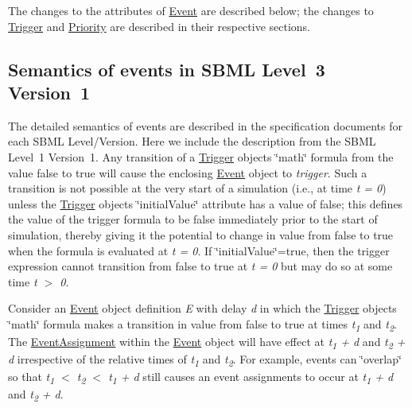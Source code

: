 The changes to the attributes of \hyperlink{class_event}{Event} are described below; the changes to \hyperlink{class_trigger}{Trigger} and \hyperlink{class_priority}{Priority} are described in their respective sections.\hypertarget{class_event_semantics}{}\subsection{Semantics of events in S\+B\+M\+L Level 3 Version 1}\label{class_event_semantics}
The detailed semantics of events are described in the specification documents for each S\+B\+ML Level/\+Version. Here we include the description from the S\+B\+ML Level~1 Version~1. Any transition of a \hyperlink{class_trigger}{Trigger} object\textquotesingle{}s \char`\"{}math\char`\"{} formula from the value {\ttfamily false} to {\ttfamily true} will cause the enclosing \hyperlink{class_event}{Event} object to {\itshape trigger}. Such a transition is not possible at the very start of a simulation (i.\+e., at time {\itshape t = 0}) unless the \hyperlink{class_trigger}{Trigger} object\textquotesingle{}s \char`\"{}initial\+Value\char`\"{} attribute has a value of {\ttfamily false}; this defines the value of the trigger formula to be {\ttfamily false} immediately prior to the start of simulation, thereby giving it the potential to change in value from {\ttfamily false} to {\ttfamily true} when the formula is evaluated at {\itshape t = 0}. If \char`\"{}initial\+Value\char`\"{}={\ttfamily true}, then the trigger expression cannot transition from {\ttfamily false} to {\ttfamily true} at {\itshape t = 0} but may do so at some time {\itshape t $>$ 0}.

Consider an \hyperlink{class_event}{Event} object definition {\itshape E} with delay {\itshape d} in which the \hyperlink{class_trigger}{Trigger} object\textquotesingle{}s \char`\"{}math\char`\"{} formula makes a transition in value from {\ttfamily false} to {\ttfamily true} at times {\itshape t\textsubscript{1}} and {\itshape t\textsubscript{2}}. The \hyperlink{class_event_assignment}{Event\+Assignment} within the \hyperlink{class_event}{Event} object will have effect at {\itshape t\textsubscript{1} + d} and {\itshape t\textsubscript{2} + d} irrespective of the relative times of {\itshape t\textsubscript{1}} and {\itshape t\textsubscript{2}}. For example, events can \char`\"{}overlap\char`\"{} so that {\itshape t\textsubscript{1} $<$ t\textsubscript{2} $<$ t\textsubscript{1} + d} still causes an event assignments to occur at {\itshape t\textsubscript{1} + d} and {\itshape t\textsubscript{2} + d}.

